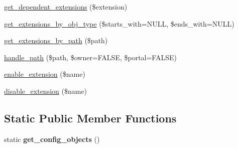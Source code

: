 \begin{DoxyCompactItemize}
\item 
\hyperlink{classextensionmanager_af6fe561873a02f4a15534d57abbf576a}{get\_\-dependent\_\-extensions} (\$extension)
\item 
\hyperlink{classextensionmanager_a914401e8a5547f4531508d9117a29186}{get\_\-extensions\_\-by\_\-obj\_\-type} (\$starts\_\-with=NULL, \$ends\_\-with=NULL)
\item 
\hyperlink{classextensionmanager_aaec1bf49db2b6bda39a482b988d993da}{get\_\-extensions\_\-by\_\-path} (\$path)
\item 
\hyperlink{classextensionmanager_a6151a3d997cafcbb3f0c44f6a8c6d8a1}{handle\_\-path} (\$path, \$owner=FALSE, \$portal=FALSE)
\item 
\hyperlink{classextensionmanager_ac2da799d740734f238b5be10850da673}{enable\_\-extension} (\$name)
\item 
\hyperlink{classextensionmanager_afa94c57be978758133679b3f817b0b7e}{disable\_\-extension} (\$name)
\end{DoxyCompactItemize}
\subsection*{Static Public Member Functions}
\begin{DoxyCompactItemize}
\item 
\hypertarget{classextensionmanager_ab55962981b54d9a1e2006d3152e549a4}{
static {\bfseries get\_\-config\_\-objects} ()}
\label{classextensionmanager_ab55962981b54d9a1e2006d3152e549a4}

\end{DoxyCompactItemize}


